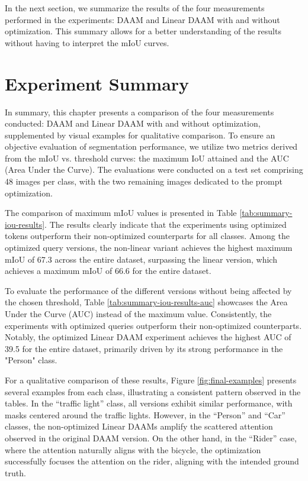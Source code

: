 In the next section, we summarize the results of the four measurements performed in the experiments: DAAM and Linear DAAM with and without optimization. This summary allows for a better understanding of the results without having to interpret the mIoU curves.

\section{Experiment Summary}
\label{sec:experiment-summary}

In summary, this chapter presents a comparison of the four measurements conducted: DAAM and Linear DAAM with and without optimization, supplemented by visual examples for qualitative comparison. To ensure an objective evaluation of segmentation performance, we utilize two metrics derived from the mIoU vs. threshold curves: the maximum IoU attained and the AUC (Area Under the Curve). The evaluations were conducted on a test set comprising 48 images per class, with the two remaining images dedicated to the prompt optimization.


The comparison of maximum mIoU values is presented in Table \ref{tab:summary-iou-results}. The results clearly indicate that the experiments using optimized tokens outperform their non-optimized counterparts for all classes. Among the optimized query versions, the non-linear variant achieves the highest maximum mIoU of 67.3 across the entire dataset, surpassing the linear version, which achieves a maximum mIoU of 66.6 for the entire dataset.

To evaluate the performance of the different versions without being affected by the chosen threshold, Table \ref{tab:summary-iou-results-auc} showcases the Area Under the Curve (AUC) instead of the maximum value. Consistently, the experiments with optimized queries outperform their non-optimized counterparts. Notably, the optimized Linear DAAM experiment achieves the highest AUC of 39.5 for the entire dataset, primarily driven by its strong performance in the "Person" class.

For a qualitative comparison of these results, Figure \ref{fig:final-examples} presents several examples from each class, illustrating a consistent pattern observed in the tables. In the ``traffic light'' class, all versions exhibit similar performance, with masks centered around the traffic lights. However, in the ``Person'' and ``Car'' classes, the non-optimized Linear DAAMs amplify the scattered attention observed in the original DAAM version. On the other hand, in the ``Rider'' case, where the attention naturally aligns with the bicycle, the optimization successfully focuses the attention on the rider, aligning with the intended ground truth.

